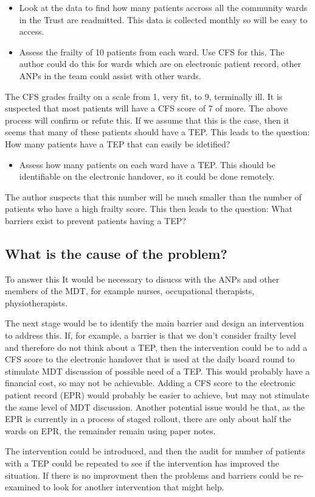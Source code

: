 \documentclass[12pt,a4paper,oneside,titlepage]{article}
\begin{document}
\begin{itemize}
\item Look at the data to find how many patients accross all the community wards in the
    Trust are readmitted. This data is collected monthly so will be easy to access.
\item Assess the frailty of 10 patients from each ward. Use CFS for this.
	The author could do this for wards which are on electronic patient record, other ANPs
	in the team could assist with other wards.
\end{itemize}

The CFS grades frailty on a scale from 1, very fit, to 9, terminally ill.
It is suspected that most patients will have a CFS score of 7 of more. The above process 
will confirm or refute this. If we assume that this is the case, then it seems
that many of these patients should have a TEP. This leads to the question: 
How many patients have a TEP that can easily be idetified?

\begin{itemize}

\item Assess how many patients on each ward have a TEP. This should be identifiable on 
	the electronic handover, so it could be done remotely.
\end{itemize}

The author suspects that this number will be much smaller than the number of patients 
who have a high frailty score. This then leads to the question: 
What barriers exist to prevent patients having a TEP?

\subsection*{What is the cause of the problem?}
To answer this It would be necessary to disucss with the ANPs and other members of
the MDT, for example nurses, occupational therapists, physiotherapists.

The next stage would be to identify the main barrier and design an intervention to
address this. If, for example, a barrier is that we don't consider frailty level and
therefore do not think about a TEP, then the intervention could be to add a CFS score
to the electronic handover that is used at the daily board round to stimulate MDT
discussion of possible need of a TEP. This would probably have a financial cost, so
may not be achievable. Adding a CFS score to the electronic patient record (EPR) would 
probably be easier to achieve, but may not stimulate the same level of MDT discussion.
Another potential issue would be that, as the EPR is currently in a process of staged 
rollout, there are only about half the wards on EPR, the remainder remain using paper notes.

The intervention could be introduced, and then the audit for number of patients with 
a TEP could be repeated to see if the intervention has improved the situation. If there 
is no improvment then the problems and barriers could be re-examined to look for another
intervention that might help.

\clearpage
\printbibliography[prenote=needsfixing]
\end{document}
